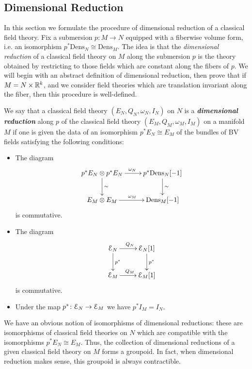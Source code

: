 \documentclass[10pt, oneside]{article}
\newcommand{\Dens}{\mathrm{Dens}}
\newcommand{\defterm}[1]{\textbf{\emph{#1}}}
\begin{document}
\subsection{Dimensional Reduction} \label{dim_red_section}

In this section we formulate the procedure of dimensional reduction of a classical field theory. Fix a submersion $p\colon M\rightarrow N$ equipped with a fiberwise volume form, i.e. an isomorphism $p^*\Dens_N\cong \Dens_M$.  The idea is that the \emph{dimensional reduction} of a classical field theory on $M$ along the submersion $p$ is the theory obtained by restricting to those fields which are constant along the fibers of $p$.  We will begin with an abstract definition of dimensional reduction, then prove that if $M = N \times \mathbb R^k$, and we consider field theories which are translation invariant along the fiber, then this procedure is well-defined.

\begin{definition}
We say that a classical field theory $(E_N, Q_N, \omega_N, I_N)$ on $N$ is a \defterm{dimensional reduction} along $p$ of the classical field theory $(E_M, Q_M, \omega_M, I_M)$ on a manifold $M$ if one is given the data of an isomorphism $p^* E_N\cong E_M$ of the bundles of BV fields satisfying the following conditions:
\begin{itemize}
\item The diagram
\[
\xymatrix{
p^* E_N\otimes p^* E_N \ar^{\omega_N}[r] \ar^{\sim}[d] & p^*\Dens_N[-1] \ar^{\sim}[d] \\
E_M\otimes E_M \ar^{\omega_M}[r] & \Dens_M[-1]
}
\]
is commutative.

\item The diagram
\[
\xymatrix{
\cE_N \ar^{Q_N}[r] \ar^{p^*}[d] & \cE_N[1] \ar^{p^*}[d] \\
\cE_M \ar^{Q_M}[r] & \cE_M[1]
}
\]
is commutative.

\item Under the map $p^*\colon \mathcal E_N\rightarrow \mathcal E_M$ we have $p^* I_M = I_N$.
\end{itemize}
\end{definition}

We have an obvious notion of isomorphisms of dimensional reductions: these are isomorphisms of classical field theories on $N$ which are compatible with the isomorphisms $p^* E_N\cong E_M$. Thus, the collection of dimensional reductions of a given classical field theory on $M$ forms a groupoid.  In fact, when dimensional reduction makes sense, this groupoid is always contractible.
\end{document}
